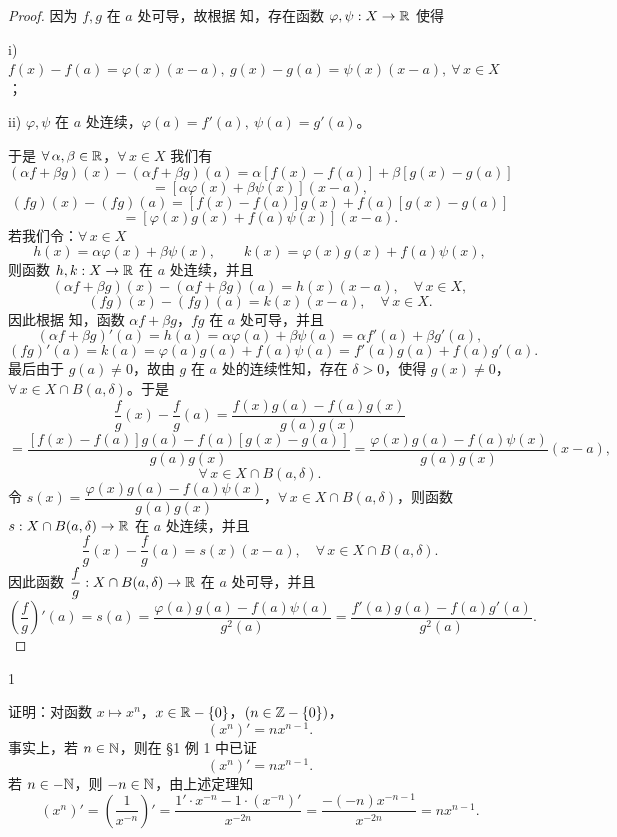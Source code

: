 \begin{proof}

	因为 \(f,g\) 在 \(a\) 处可导，故根据 知，存在函数 \(\varphi,\psi:X\to\mathbb{R}\) 使得

	i) \(f(x)-f(a)=\varphi(x)(x-a),\ g(x)-g(a)=\psi(x)(x-a),\ \forall\,x\in X\)；

	ii) \(\varphi,\psi\) 在 \(a\) 处连续，\(\varphi(a)=f'(a),\ \psi(a)=g'(a)\)。

	于是 \(\forall\,\alpha,\beta\in\mathbb{R}\)，\(\forall\,x\in X\) 我们有
	\[
	(\alpha f+\beta g)(x)-(\alpha f+\beta g)(a)=\alpha[f(x)-f(a)]+\beta[g(x)-g(a)]
	\]
	\[
	=[\alpha\varphi(x)+\beta\psi(x)](x-a),
	\]
	\[
	(fg)(x)-(fg)(a)=[f(x)-f(a)]g(x)+f(a)[g(x)-g(a)]
	\]
	\[
	=[\varphi(x)g(x)+f(a)\psi(x)](x-a).
	\]
	若我们令：\(\forall\,x\in X\)
	\[
	h(x)=\alpha\varphi(x)+\beta\psi(x),\qquad k(x)=\varphi(x)g(x)+f(a)\psi(x),
	\]
	则函数 \(h,k:X\to\mathbb{R}\) 在 \(a\) 处连续，并且
	\[
	(\alpha f+\beta g)(x)-(\alpha f+\beta g)(a)=h(x)(x-a),\quad\forall\,x\in X,
	\]
	\[
	(fg)(x)-(fg)(a)=k(x)(x-a),\quad\forall\,x\in X.
	\]
	因此根据 知，函数 \(\alpha f+\beta g\)，\(fg\) 在 \(a\) 处可导，并且
	\[
	(\alpha f+\beta g)'(a)=h(a)=\alpha\varphi(a)+\beta\psi(a)=\alpha f'(a)+\beta g'(a),
	\]
	\[
	(fg)'(a)=k(a)=\varphi(a)g(a)+f(a)\psi(a)=f'(a)g(a)+f(a)g'(a).
	\]
	最后由于 \(g(a)\neq0\)，故由 \(g\) 在 \(a\) 处的连续性知，存在 \(\delta>0\)，使得 \(g(x)\neq0\)，\(\forall\,x\in X\cap B(a,\delta)\)。于是
	\[
	\frac fg(x)-\frac fg(a)=\frac{f(x)g(a)-f(a)g(x)}{g(a)g(x)}
	\]
	\[
	=\frac{[f(x)-f(a)]g(a)-f(a)[g(x)-g(a)]}{g(a)g(x)}=\frac{\varphi(x)g(a)-f(a)\psi(x)}{g(a)g(x)}(x-a),
	\]
	\[
	\forall\,x\in X\cap B(a,\delta).
	\]
	令 \(s(x)=\dfrac{\varphi(x)g(a)-f(a)\psi(x)}{g(a)g(x)}\)，\(\forall\,x\in X\cap B(a,\delta)\)，则函数 \(s:X\cap B(a,\delta)\to\mathbb{R}\) 在 \(a\) 处连续，并且
	\[
	\frac fg(x)-\frac fg(a)=s(x)(x-a),\quad\forall\,x\in X\cap B(a,\delta).
	\]
	因此函数 \(\dfrac fg:X\cap B(a,\delta)\to\mathbb{R}\) 在 \(a\) 处可导，并且
	\[
	\left(\frac fg\right)'(a)=s(a)=\frac{\varphi(a)g(a)-f(a)\psi(a)}{g^2(a)}=\frac{f'(a)g(a)-f(a)g'(a)}{g^2(a)}.
	\]

\end{proof}

\begin{sourceexample}{1}

	证明：对函数 \(x\longmapsto x^n\)，\(x\in\mathbb{R}-\{0\}\)，\((n\in\mathbb{Z}-\{0\})\)，
	\[
	(x^n)'=nx^{n-1}.
	\]
	事实上，若 \(n\in\mathbb{N}\)，则在 §1 例 1 中已证
	\[
	(x^n)'=nx^{n-1}.
	\]
	若 \(n\in-\mathbb{N}\)，则 \(-n\in\mathbb{N}\)，由上述定理知
	\[
	(x^n)'=\left(\frac1{x^{-n}}\right)'=\frac{1'\cdot x^{-n}-1\cdot(x^{-n})'}{x^{-2n}}=\frac{-(-n)x^{-n-1}}{x^{-2n}}=nx^{n-1}.
	\]

\end{sourceexample}

